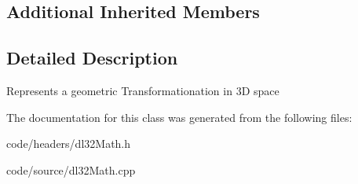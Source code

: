 \subsection*{Additional Inherited Members}


\subsection{Detailed Description}
Represents a geometric Transformationation in 3\-D space 

The documentation for this class was generated from the following files\-:\begin{DoxyCompactItemize}
\item 
code/headers/dl32\-Math.\-h\item 
code/source/dl32\-Math.\-cpp\end{DoxyCompactItemize}
